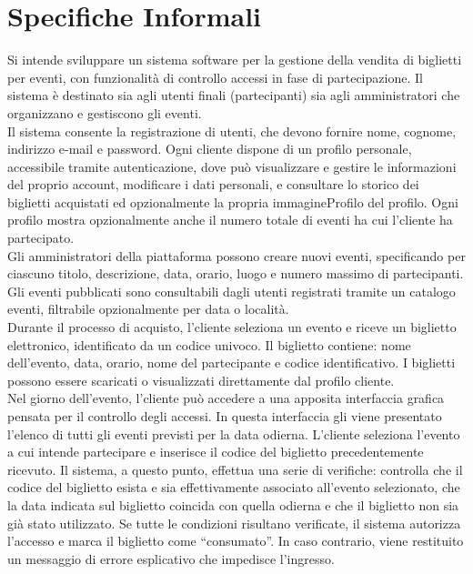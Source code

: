 \chapter{Specifiche Informali}
Si intende sviluppare un sistema software per la gestione della vendita di biglietti per eventi, con funzionalità di controllo accessi in fase di partecipazione. Il sistema è destinato sia agli utenti finali (partecipanti) sia agli amministratori che organizzano e gestiscono gli eventi.\\

\noindent Il sistema consente la registrazione di utenti, che devono fornire nome, cognome, indirizzo e-mail e password. Ogni cliente dispone di un profilo personale, accessibile tramite autenticazione, dove può visualizzare e gestire le informazioni del proprio account, modificare i dati personali, e consultare lo storico dei biglietti acquistati ed opzionalmente la propria immagineProfilo del profilo. Ogni profilo mostra opzionalmente anche il numero totale di eventi ha cui l’cliente ha partecipato.\\

\noindent Gli amministratori della piattaforma possono creare nuovi eventi, specificando per ciascuno titolo, descrizione, data, orario, luogo e numero massimo di partecipanti. Gli eventi pubblicati sono consultabili dagli utenti registrati tramite un catalogo eventi, filtrabile opzionalmente per data o località.\\

\noindent Durante il processo di acquisto, l’cliente seleziona un evento e riceve un biglietto elettronico, identificato da un codice univoco. Il biglietto contiene: nome dell’evento, data, orario, nome del partecipante e codice identificativo. I biglietti possono essere scaricati o visualizzati direttamente dal profilo cliente.\\

\noindent Nel giorno dell’evento, l’cliente può accedere a una apposita interfaccia grafica pensata per il controllo degli accessi. In questa interfaccia gli viene presentato l’elenco di tutti gli eventi previsti per la data odierna. L’cliente seleziona l’evento a cui intende partecipare e inserisce il codice del biglietto precedentemente ricevuto. Il sistema, a questo punto, effettua una serie di verifiche: controlla che il codice del biglietto esista e sia effettivamente associato all’evento selezionato, che la data indicata sul biglietto coincida con quella odierna e che il biglietto non sia già stato utilizzato. Se tutte le condizioni risultano verificate, il sistema autorizza l’accesso e marca il biglietto come “consumato”. In caso contrario, viene restituito un messaggio di errore esplicativo che impedisce l’ingresso.\\

